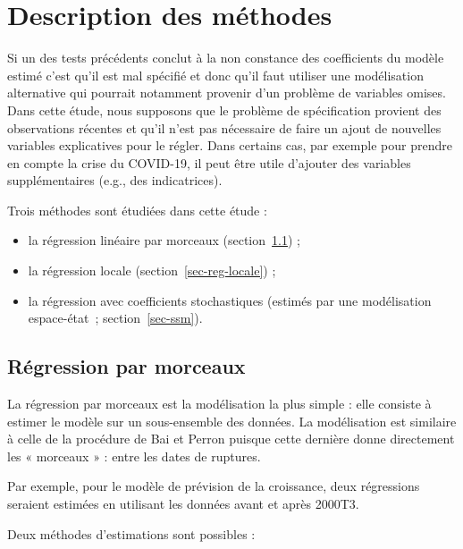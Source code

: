 \documentclass[
  a4paper,
  DIV=11,
  numbers=noendperiod,
  french]{scrartcl}
\newcommand\1{{\mathds 1}}
\theoremstyle{remark}
\begin{document}
\section{Description des méthodes}\label{sec-desc-meth}

Si un des tests précédents conclut à la non constance des coefficients
du modèle estimé c'est qu'il est mal spécifié et donc qu'il faut
utiliser une modélisation alternative qui pourrait notamment provenir
d'un problème de variables omises. Dans cette étude, nous supposons que
le problème de spécification provient des observations récentes et qu'il
n'est pas nécessaire de faire un ajout de nouvelles variables
explicatives pour le régler. Dans certains cas, par exemple pour prendre
en compte la crise du COVID-19, il peut être utile d'ajouter des
variables supplémentaires (e.g., des indicatrices).

Trois méthodes sont étudiées dans cette étude :

\begin{itemize}
\item
  la régression linéaire par morceaux (section~\ref{sec-reg-morceaux}) ;
\item
  la régression locale (section~\ref{sec-reg-locale}) ;
\item
  la régression avec coefficients stochastiques (estimés par une
  modélisation espace-état~; section~\ref{sec-ssm}).
\end{itemize}

\subsection{Régression par morceaux}\label{sec-reg-morceaux}

La régression par morceaux est la modélisation la plus simple : elle
consiste à estimer le modèle sur un sous-ensemble des données. La
modélisation est similaire à celle de la procédure de Bai et Perron
puisque cette dernière donne directement les « morceaux » : entre les
dates de ruptures.

Par exemple, pour le modèle de prévision de la croissance, deux
régressions seraient estimées en utilisant les données avant et après
2000T3.

Deux méthodes d'estimations sont possibles :
\end{document}
